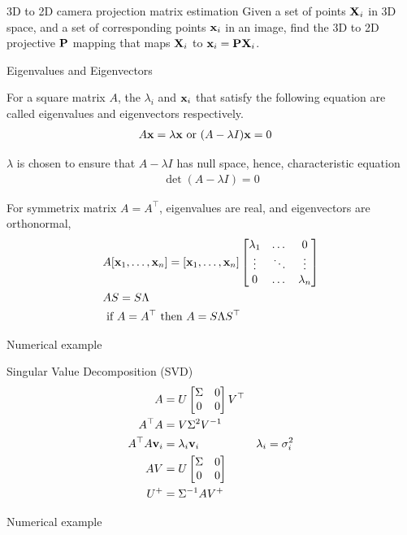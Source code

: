 \documentclass[times,t]{beamer}
\begin{document}
\begin{frame}{3D  to  2D camera projection matrix estimation}
  Given a set of points $\mathbf{X}_i$ in 3D space, and a set
  of corresponding points $\mathbf{x}_i$ in an image, find the 3D to 2D projective
  $\mathbf{P}$ mapping
  that maps $\mathbf{X}_i$ to $\mathbf{x}_i  =  \mathbf{P}\mathbf{X}_i$.
  \end{frame}

\begin{frame}{Eigenvalues  and Eigenvectors}

For a  square  matrix $A$, the $\lambda_i$ and  $\mathbf{x}_i$ that satisfy  the
following equation are called eigenvalues and  eigenvectors  respectively.
\begin{align}
  A  \mathbf{x} &= \lambda \mathbf{x} \text{ or } (A  - \lambda I)\mathbf{x}  = 0
\end{align}

$\lambda$ is   chosen to ensure  that   $A  -  \lambda I$  has null space,
hence, characteristic   equation
\begin{align}
  \det(A  - \lambda I) = 0 
 \end{align}

 For  symmetrix matrix $A =  A^\top$, eigenvalues  are  real, and eigenvectors
 are orthonormal,
 \begin{align}
   &A[\mathbf{x}_1, \dots,   \mathbf{x}_n]  = [\mathbf{x}_1, \dots,   \mathbf{x}_n]\begin{bmatrix}\lambda_1 &   \dots   &  0 \\
     \vdots   &   \ddots &  \vdots \\
   0 &   \dots  &  \lambda_n \end{bmatrix}
                  \\
   &A  S = S  \Lambda
   \\
   &\text{  if   }  A =  A^\top \text{ then   }  A   = S \Lambda S^\top
   \end{align}


\end{frame}

\begin{frame}{Numerical example}
\end{frame}

\begin{frame}{Singular Value  Decomposition (SVD)}
  \begin{align}
    A  &=   U  \begin{bmatrix}\Sigma   &  0  \\   0  &  0 \end{bmatrix} V^\top \\
    A^\top A &= V \Sigma^2  V^{-1} \\
    A^\top A \mathbf{v}_i  &= \lambda_i \mathbf{v}_i & \lambda_i = \sigma_i^2\\
    A V   &= U \begin{bmatrix}\Sigma   &  0  \\   0  &  0 \end{bmatrix}\\
    U^+   &=  \Sigma^{-1}AV^+
    \end{align}
\end{frame}

\begin{frame}{Numerical example}
\end{frame}
\end{document}
